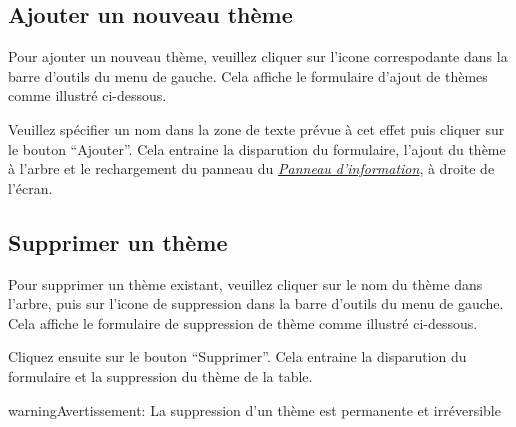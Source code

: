 \documentclass[letterpaper,10pt,french]{sphinxmanual}
\begin{document}
\subsection{Ajouter un nouveau thème}
\label{themes/themeslist:ajouter-un-nouveau-theme}
Pour ajouter un nouveau thème, veuillez cliquer sur l'icone
correspodante dans la barre d'outils du menu de gauche. Cela affiche
le formulaire d'ajout de thèmes comme illustré ci-dessous.


Veuillez spécifier un nom dans la zone de texte prévue à cet effet
puis cliquer sur le bouton ``Ajouter''. Cela entraine la disparution du
formulaire, l'ajout du thème à l'arbre et le rechargement du panneau
du {\hyperref[themes/infopanel::doc]{\emph{\emph{Panneau d'information}}}}, à droite de l'écran.


\subsection{Supprimer un thème}
\label{themes/themeslist:supprimer-un-theme}
Pour supprimer un thème existant, veuillez cliquer sur le nom du thème
dans l'arbre, puis sur l'icone de suppression dans la barre d'outils
du menu de gauche. Cela affiche le formulaire de suppression de thème
comme illustré ci-dessous.


Cliquez ensuite sur le bouton ``Supprimer''. Cela entraine la
disparution du formulaire et la suppression du thème de la table.

\begin{notice}{warning}{Avertissement:}
La suppression d'un thème est permanente et irréversible
\end{notice}
\end{document}
